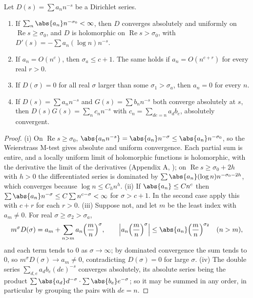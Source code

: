 \begin{proposition}\label{prop:lfunctions:dirichlet-series}
Let $D(s)=\sum a_nn^{-s}$ be a Dirichlet series.
\begin{enumerate}[label=(\roman*)]
\item If $\sum_n\abs{a_n}n^{-\sigma_0}<\infty$, then $D$ converges absolutely and uniformly on $\operatorname{Re}s\ge\sigma_0$, and $D$ is holomorphic on $\operatorname{Re}s>\sigma_0$,
with $D'(s)=-\sum a_n(\log n)n^{-s}$.
\item If $a_n=O(n^c)$, then $\sigma_a\le c+1$. The same holds if $a_n=O(n^{c+r})$ for every real $r>0$.
\item If $D(\sigma)=0$ for all real $\sigma$ larger than some $\sigma_1>\sigma_a$, then $a_n=0$ for every $n$.
\item If $D(s)=\sum a_nn^{-s}$ and $G(s)=\sum b_nn^{-s}$ both converge absolutely at $s$, then $D(s)G(s)=\sum_nc_nn^{-s}$ with $c_n=\sum_{de=n}a_db_e$, absolutely convergent.
\end{enumerate}
\end{proposition}

\begin{proof}
(i) On $\operatorname{Re}s\ge\sigma_0$, $\abs{a_nn^{-s}}=\abs{a_n}n^{-\sigma}\le\abs{a_n}n^{-\sigma_0}$, so the Weierstrass M-test gives absolute and uniform convergence. Each partial
sum is entire, and a locally uniform limit of holomorphic functions is holomorphic, with the derivative the limit of the derivatives (Appendix A,
); on $\operatorname{Re}s\ge\sigma_0+2h$ with $h>0$ the differentiated series is dominated by $\sum\abs{a_n}(\log n)n^{-\sigma_0-2h}$, which converges
because $\log n\le C_hn^h$.
(ii) If $\abs{a_n}\le Cn^c$ then $\sum\abs{a_n}n^{-\sigma}\le C\sum n^{c-\sigma}<\infty$ for $\sigma>c+1$. In the second case apply this with $c+r$ for each $r>0$.
(iii) Suppose not, and let $m$ be the least index with $a_m\ne0$. For real $\sigma\ge\sigma_2>\sigma_a$,
\[
m^\sigma D(\sigma)=a_m+\sum_{n>m}a_n\Bigl(\frac mn\Bigr)^\sigma,\qquad\Bigl\lvert a_n\Bigl(\frac mn\Bigr)^\sigma\Bigr\rvert\le\abs{a_n}\Bigl(\frac mn\Bigr)^{\sigma_2}\quad(n>m),
\]
and each term tends to $0$ as $\sigma\to\infty$; by dominated convergence the sum tends to $0$, so $m^\sigma D(\sigma)\to a_m\ne0$, contradicting $D(\sigma)=0$ for large
$\sigma$.
(iv) The double series $\sum_{d,e}a_db_e(de)^{-s}$ converges absolutely, its absolute series being the product $\sum\abs{a_d}d^{-\sigma}\cdot\sum\abs{b_e}e^{-\sigma}$; so it may be
summed in any order, in particular by grouping the pairs with $de=n$.
\end{proof}

